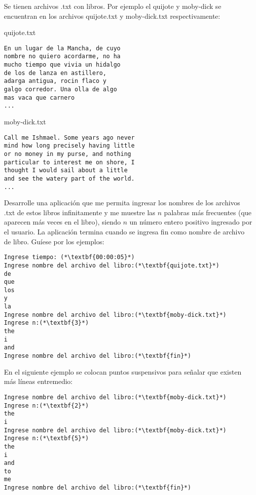 \documentclass[11pt,spanish,letterpaper]{article}
\begin{document}
Se tienen archivos .txt con libros. Por ejemplo el quijote y moby-dick se encuentran en los archivos quijote.txt y moby-dick.txt respectivamente:
\\
\begin{minipage}[T]{21em}
  \centering
quijote.txt
  \begin{lstlisting}[basicstyle=\ttfamily\small, frame = single]
En un lugar de la Mancha, de cuyo
nombre no quiero acordarme, no ha
mucho tiempo que vivia un hidalgo
de los de lanza en astillero, 
adarga antigua, rocin flaco y 
galgo corredor. Una olla de algo 
mas vaca que carnero
...
  \end{lstlisting}
\end{minipage}
\hfill
\begin{minipage}[T]{20em}
  \centering
moby-dick.txt
  \begin{lstlisting}[basicstyle=\ttfamily\small, frame = single]
Call me Ishmael. Some years ago never
mind how long precisely having little
or no money in my purse, and nothing 
particular to interest me on shore, I
thought I would sail about a little 
and see the watery part of the world.
...
  \end{lstlisting}
\end{minipage}

Desarrolle una aplicación que me permita ingresar los nombres de los archivos .txt de estos libros infinitamente y me muestre las $n$ palabras más frecuentes (que aparecen más veces en el libro), siendo $n$ un número entero positivo ingresado por el usuario. La aplicación termina cuando se ingresa fin como nombre de archivo de libro. Guíese por los ejemplos:

 \begin{lstlisting}[language=testcase, frame=single]
Ingrese tiempo: (*\textbf{00:00:05}*)
Ingrese nombre del archivo del libro:(*\textbf{quijote.txt}*)
de
que
los
y
la
Ingrese nombre del archivo del libro:(*\textbf{moby-dick.txt}*)
Ingrese n:(*\textbf{3}*)
the
i
and
Ingrese nombre del archivo del libro:(*\textbf{fin}*)
 \end{lstlisting}

En el siguiente ejemplo se colocan puntos suspensivos para señalar que existen más líneas entremedio:
 
 \begin{lstlisting}[language=testcase, frame=single]
Ingrese nombre del archivo del libro:(*\textbf{moby-dick.txt}*)
Ingrese n:(*\textbf{2}*)
the
i
Ingrese nombre del archivo del libro:(*\textbf{moby-dick.txt}*)
Ingrese n:(*\textbf{5}*)
the
i
and
to
me
Ingrese nombre del archivo del libro:(*\textbf{fin}*)
 \end{lstlisting}
\end{document}
